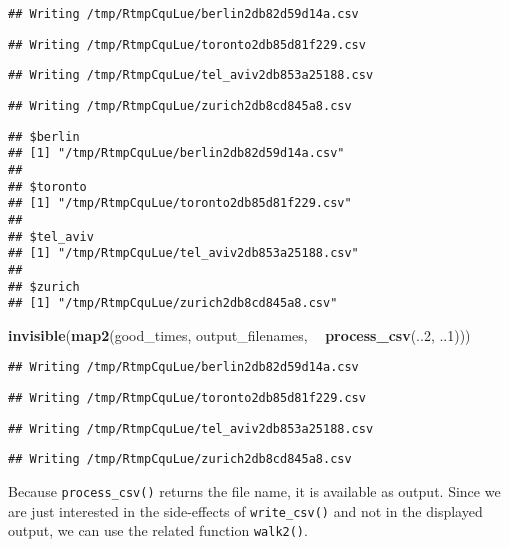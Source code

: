 \documentclass[]{book}
\newenvironment{Shaded}{\begin{snugshade}}{\end{snugshade}}
\newcommand{\DecValTok}[1]{\textcolor[rgb]{0.00,0.00,0.81}{#1}}
\newcommand{\KeywordTok}[1]{\textcolor[rgb]{0.13,0.29,0.53}{\textbf{#1}}}
\newcommand{\NormalTok}[1]{#1}
\newcommand{\OperatorTok}[1]{\textcolor[rgb]{0.81,0.36,0.00}{\textbf{#1}}}
\newcommand{\StringTok}[1]{\textcolor[rgb]{0.31,0.60,0.02}{#1}}
\begin{document}
\begin{verbatim}
## Writing /tmp/RtmpCquLue/berlin2db82d59d14a.csv
\end{verbatim}

\begin{verbatim}
## Writing /tmp/RtmpCquLue/toronto2db85d81f229.csv
\end{verbatim}

\begin{verbatim}
## Writing /tmp/RtmpCquLue/tel_aviv2db853a25188.csv
\end{verbatim}

\begin{verbatim}
## Writing /tmp/RtmpCquLue/zurich2db8cd845a8.csv
\end{verbatim}

\begin{verbatim}
## $berlin
## [1] "/tmp/RtmpCquLue/berlin2db82d59d14a.csv"
## 
## $toronto
## [1] "/tmp/RtmpCquLue/toronto2db85d81f229.csv"
## 
## $tel_aviv
## [1] "/tmp/RtmpCquLue/tel_aviv2db853a25188.csv"
## 
## $zurich
## [1] "/tmp/RtmpCquLue/zurich2db8cd845a8.csv"
\end{verbatim}

\begin{Shaded}
\begin{Highlighting}[]
\KeywordTok{invisible}\NormalTok{(}\KeywordTok{map2}\NormalTok{(good_times, output_filenames, }\OperatorTok{~}\StringTok{ }\KeywordTok{process_csv}\NormalTok{(..}\DecValTok{2}\NormalTok{, ..}\DecValTok{1}\NormalTok{)))}
\end{Highlighting}
\end{Shaded}

\begin{verbatim}
## Writing /tmp/RtmpCquLue/berlin2db82d59d14a.csv
\end{verbatim}

\begin{verbatim}
## Writing /tmp/RtmpCquLue/toronto2db85d81f229.csv
\end{verbatim}

\begin{verbatim}
## Writing /tmp/RtmpCquLue/tel_aviv2db853a25188.csv
\end{verbatim}

\begin{verbatim}
## Writing /tmp/RtmpCquLue/zurich2db8cd845a8.csv
\end{verbatim}

Because \texttt{process\_csv()} returns the file name, it is available as output.
Since we are just interested in the side-effects of \texttt{write\_csv()} and not in the displayed output, we can use the related function \texttt{walk2()}.
\end{document}
